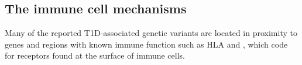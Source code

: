 
\subsection{The immune cell mechanisms}

Many of the reported T1D-associated genetic variants are located in proximity to genes and regions with known immune function such as HLA and ,
which code for receptors found at the surface of immune cells.

